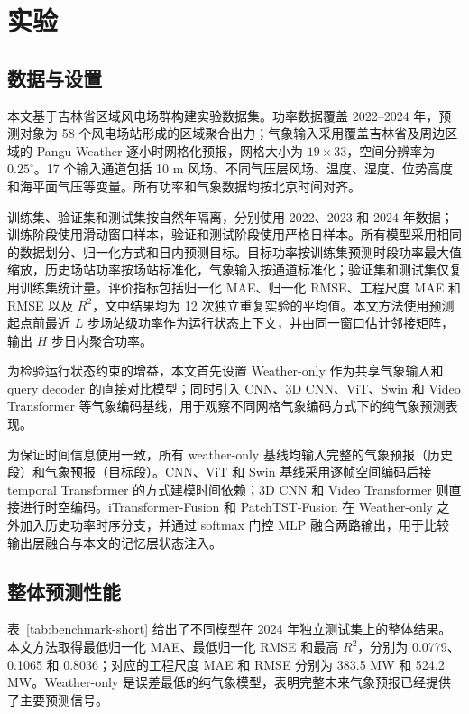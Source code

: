 \section{实验}

\subsection{数据与设置}

本文基于吉林省区域风电场群构建实验数据集。功率数据覆盖 2022--2024 年，预测对象为 58 个风电场站形成的区域聚合出力；气象输入采用覆盖吉林省及周边区域的 Pangu-Weather 逐小时网格化预报，网格大小为 \(19\times33\)，空间分辨率为 \(0.25^\circ\)。17 个输入通道包括 10 m 风场、不同气压层风场、温度、湿度、位势高度和海平面气压等变量。所有功率和气象数据均按北京时间对齐。

训练集、验证集和测试集按自然年隔离，分别使用 2022、2023 和 2024 年数据；训练阶段使用滑动窗口样本，验证和测试阶段使用严格日样本。所有模型采用相同的数据划分、归一化方式和日内预测目标。目标功率按训练集预测时段功率最大值缩放，历史场站功率按场站标准化，气象输入按通道标准化；验证集和测试集仅复用训练集统计量。评价指标包括归一化 MAE、归一化 RMSE、工程尺度 MAE 和 RMSE 以及 \(R^2\)，文中结果均为 12 次独立重复实验的平均值。本文方法使用预测起点前最近 \(L\) 步场站级功率作为运行状态上下文，并由同一窗口估计邻接矩阵，输出 \(H\) 步日内聚合功率。

为检验运行状态约束的增益，本文首先设置 Weather-only 作为共享气象输入和 query decoder 的直接对比模型；同时引入 CNN、3D CNN、ViT、Swin 和 Video Transformer 等气象编码基线，用于观察不同网格气象编码方式下的纯气象预测表现。

为保证时间信息使用一致，所有 weather-only 基线均输入完整的气象预报（历史段）和气象预报（目标段）。CNN、ViT 和 Swin 基线采用逐帧空间编码后接 temporal Transformer 的方式建模时间依赖；3D CNN 和 Video Transformer 则直接进行时空编码。iTransformer-Fusion 和 PatchTST-Fusion 在 Weather-only 之外加入历史功率时序分支，并通过 softmax 门控 MLP 融合两路输出，用于比较输出层融合与本文的记忆层状态注入。

\subsection{整体预测性能}

表~\ref{tab:benchmark-short} 给出了不同模型在 2024 年独立测试集上的整体结果。本文方法取得最低归一化 MAE、最低归一化 RMSE 和最高 \(R^2\)，分别为 0.0779、0.1065 和 0.8036；对应的工程尺度 MAE 和 RMSE 分别为 383.5 MW 和 524.2 MW。Weather-only 是误差最低的纯气象模型，表明完整未来气象预报已经提供了主要预测信号。


